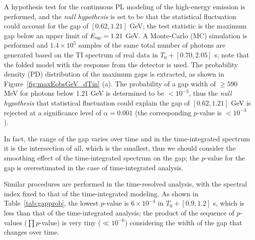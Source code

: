 \documentclass[linenumbers,twocolumn]{aastex631}
\begin{document}
A hypothesis test for the continuous PL modeling of the high-energy emission is performed, and the \textit{null hypothesis} is set to be that the statistical fluctuation could account for the gap of $[0.62,1.21]$ GeV; the test statistic is the maximum gap below an upper limit of $E_{\rm up}=1.21$ GeV. %
A Monte-Carlo (MC) simulation is performed and $1.4\times10^5$ samples of the same total number of photons are generated based on the TI spectrum of real data in $T_0+[0.70,2.05]$ s; note that the folded model with the response from the detector is used. The probability density (PD) distribution of the maximum gaps is extracted, as shown in Figure~\ref{fig:maxEobsGeV_dTin} (a). The probability of a gap width of $\geq590$ MeV for photons below 1.21 GeV is determined to be $<10^{-3}$, thus the \textit{null hypothesis} that statistical fluctuation could explain the gap of $[0.62,1.21]$ GeV is rejected at a significance level of $\alpha=0.001$ (the corresponding $p$-value is $<10^{-3}$).


In fact, the range of the gap varies over time and in the time-integrated spectrum it is the intersection of all, which is the smallest, thus we should consider the smoothing effect of the time-integrated spectrum on the gap; the $p$-value for the gap is overestimated in the case of time-integrated analysis. %

Similar procedures are performed in the time-resolved analysis, with the spectral index fixed to that of the time-integrated modeling. As shown in Table~\ref{tab:gapprob}, the lowest $p$-value is $6\times10^{-4}$ in $T_0+[0.9, 1.2]$ s, which is less than that of the time-integrated analysis; the product of the sequence of $p$-values ($\prod p$-value) is very tiny ($\ll10^{-6}$) considering the width of the gap that changes over time.
\end{document}
